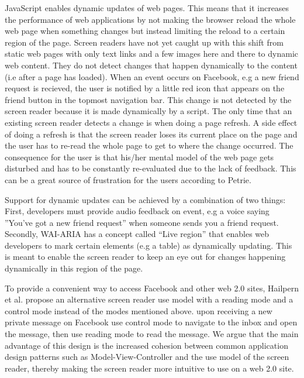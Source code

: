\documentclass[conference]{IEEEtran}
\begin{document}
JavaScript enables dynamic updates of web pages. This means that it increases
the performance of web applications by not making the browser reload the whole
web page when something changes but instead limiting the reload to a certain
region of the page. Screen readers have not yet caught up with this shift from
static web pages with only text links and a few images here and there to
dynamic web content. They do not detect changes that happen dynamically to the
content (i.e after a page has loaded)\cite{hailpern2009}. When an event occurs
on Facebook, e.g a new friend request is recieved, the user is notified by a
little red icon that appears on the friend button in the topmost navigation
bar. This change is not detected by the screen reader\cite{buzzi2010} because
it is made dynamically by a script.  The only time that an existing screen
reader detects a change is when doing a page refresh. A side effect of doing a
refresh is that the screen reader loses its current place on the page and the
user has to re-read the whole page to get to where the change occurred. The
consequence for the user is that his/her mental model of the web page gets
disturbed and has to be constantly re-evaluated due to the lack of feedback.
This can be a great source of frustration for the users according to
Petrie\cite{petrie2004}.

Support for dynamic updates can be achieved by a combination of two
things\cite{hailpern2009}: First, developers must provide audio feedback on
event, e.g a voice saying ''You've got a new friend request'' when someone
sends you a friend request. Secondly, WAI-ARIA has a concept called ``Live
region''\cite{ariaspec} that enables web developers to mark certain elements
(e.g a table) as dynamically updating. This is meant to enable the screen
reader to keep an eye out for changes happening dynamically in this region of
the page.

To provide a convenient way to access Facebook and other web 2.0 sites,
Hailpern et al\cite{hailpern2009}.  propose an alternative screen reader use
model with a reading mode and a control mode instead of the modes mentioned
above. upon receiving a new private message on Facebook use control mode to
navigate to the inbox and open the message, then use reading mode to read the
message.  We argue that the main advantage of this design is the increased
cohesion between common application design patterns such as
Model-View-Controller and the use model of the screen reader, thereby making
the screen reader more intuitive to use on a web 2.0 site. 
\end{document}
